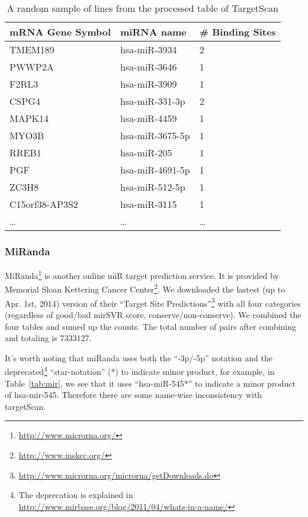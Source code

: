 \documentclass{scrartcl}
\numberwithin{figure}{section}
\numberwithin{table}{section}
\begin{document}
\begin{table}[h!]
\centering
\caption{A random sample of lines from the processed table of TargetScan}
\label{tab:ts}
\bigskip
\begin{tabular}{lll}
\toprule
  mRNA Gene Symbol & miRNA name      & \# Binding Sites \\
\midrule
  TMEM189          & hsa-miR-3934    & 2 \\
  PWWP2A           & hsa-miR-3646    & 1 \\
  F2RL3            & hsa-miR-3909    & 1 \\
  CSPG4            & hsa-miR-331-3p  & 2 \\
  MAPK14           & hsa-miR-4459    & 1 \\
  MYO3B            & hsa-miR-3675-5p & 1 \\
  RREB1            & hsa-miR-205     & 1 \\
  PGF              & hsa-miR-4691-5p & 1 \\
  ZC3H8            & hsa-miR-512-5p  & 1 \\
  C15orf38-AP3S2   & hsa-miR-3115    & 1 \\
  \ldots           & \ldots          & \ldots \\
\bottomrule
\end{tabular}
\end{table}

\subsubsection{MiRanda}

MiRanda\footnote{\url{http://www.microrna.org/}} is another online miR target
prediction service. It is provided by Memorial Sloan Kettering Cancer
Center\footnote{\url{http://www.mskcc.org/}}. We downloaded the lastest (up to
Apr. 1st, 2014) version of their ``Target Site
Predictions''\footnote{\url{http://www.microrna.org/microrna/getDownloads.do}}
with all four categories (regardless of good/bad mirSVR score,
conserve/non-conserve). We combined the four tables and sumed up the counts.
The total number of pairs after combining and totaling is 7333127.

It's worth noting that miRanda uses both the ``-3p/-5p'' notation and the
deprecated\footnote{The deprecation is explained in
\url{http://www.mirbase.org/blog/2011/04/whats-in-a-name/}} ``star-notation''
(*) to indicate minor product, for example, in Table~\ref{tab:mir}, we see that
it uses ``hsa-miR-545*'' to indicate a minor product of hsa-mir-545. Therefore
there are some name-wise inconsistency with targetScan.
\end{document}
